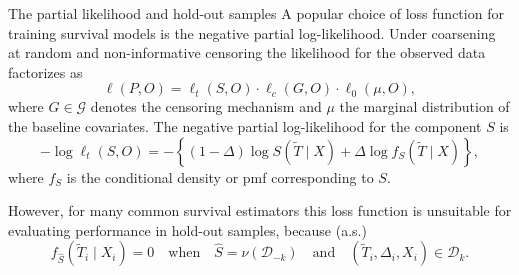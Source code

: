 \documentclass[smaller]{beamer}\usepackage{listings}
\newcommand{\est}{\ensuremath{\nu}}
\begin{document}
\begin{frame}[label={sec:org6031028}]{The partial likelihood and hold-out samples}
A popular choice of loss function for training survival models is the negative partial
log-likelihood. Under coarsening at random and non-informative censoring the likelihood for the
observed data factorizes as
\begin{equation*}
  \ell(P, O) = \ell_t(S, O) \cdot \ell_c(G, O) \cdot \ell_0(\mu, O),
\end{equation*}
where \(G \in \mathcal{G} \) denotes the censoring mechanism and $\mu$ the marginal distribution of
the baseline covariates. The negative partial log-likelihood for the component \(S\) is
\begin{equation*}
  - \log \ell_t(S, O)
  = -
  \left\{
    (1-\Delta) \log S(\tilde T \mid X)
    + \Delta \log f_S(\tilde T \mid X)
  \right\},
\end{equation*}
where \(f_S\) is the conditional density or pmf corresponding to \(S\). \vfill

However, for many common survival estimators this loss function is unsuitable for evaluating
performance in hold-out samples, because (a.s.)
\begin{equation*}
  f_{\hat S}(\tilde T_i \mid X_i) = 0
  \quad \text{when} \quad
  \hat S =\est(\mathcal{D}_{-k})
  \quad \text{and} \quad
  (\tilde T_i, \Delta_i, X_i) \in \mathcal{D}_k.
\end{equation*}
\end{frame}
\end{document}
